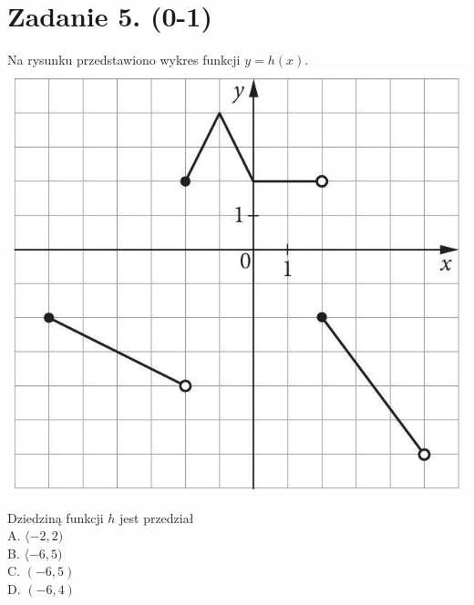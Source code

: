 \documentclass[10pt]{article}
\begin{document}
\section*{Zadanie 5. (0-1)}
Na rysunku przedstawiono wykres funkcji \(y=h(x)\).\\
\includegraphics[max width=\textwidth, center]{2024_11_21_dd21f7544b65bcf1b3c7g-02}

Dziedziną funkcji \(h\) jest przedział\\
A. \(\langle-2,2)\)\\
B. \(\langle-6,5)\)\\
C. \((-6,5)\)\\
D. \((-6,4)\)
\end{document}
